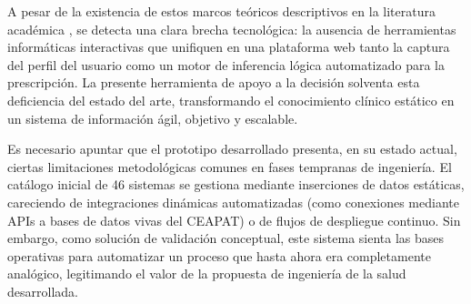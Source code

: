 A pesar de la existencia de estos marcos teóricos descriptivos en la literatura académica \cite{elibro:ubu}, se detecta una clara brecha tecnológica: la ausencia de herramientas informáticas interactivas que unifiquen en una plataforma web tanto la captura del perfil del usuario como un motor de inferencia lógica automatizado para la prescripción. La presente herramienta de apoyo a la decisión solventa esta deficiencia del estado del arte, transformando el conocimiento clínico estático en un sistema de información ágil, objetivo y escalable.

Es necesario apuntar que el prototipo desarrollado presenta, en su estado actual, ciertas limitaciones metodológicas comunes en fases tempranas de ingeniería. El catálogo inicial de 46 sistemas se gestiona mediante inserciones de datos estáticas, careciendo de integraciones dinámicas automatizadas (como conexiones mediante APIs a bases de datos vivas del CEAPAT) o de flujos de despliegue continuo. Sin embargo, como solución de validación conceptual, este sistema sienta las bases operativas para automatizar un proceso que hasta ahora era completamente analógico, legitimando el valor de la propuesta de ingeniería de la salud desarrollada.